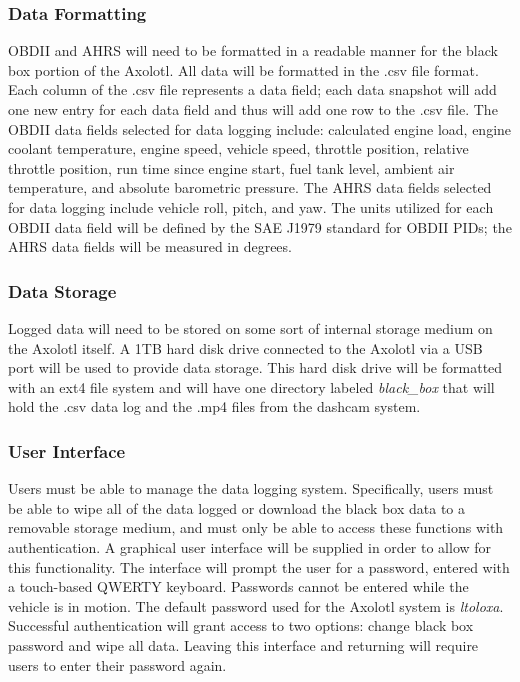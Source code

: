 \documentclass[onecolumn, draftclsnofoot,10pt, compsoc]{IEEEtran}
\begin{document}
\subsubsection{Data Formatting}
OBDII and AHRS will need to be formatted in a readable manner for the black box portion of the Axolotl. All data will be formatted in the .csv file format. Each column of the .csv file represents a data field; each data snapshot will add one new entry for each data field and thus will add one row to the .csv file. The OBDII data fields selected for data logging include: calculated engine load, engine coolant temperature, engine speed, vehicle speed, throttle position, relative throttle position, run time since engine start, fuel tank level, ambient air temperature, and absolute barometric pressure. The AHRS data fields selected for data logging include vehicle roll, pitch, and yaw. The units utilized for each OBDII data field will be defined by the SAE J1979 standard for OBDII PIDs; the AHRS data fields will be measured in degrees.

\subsubsection{Data Storage}
Logged data will need to be stored on some sort of internal storage medium on the Axolotl itself. A 1TB hard disk drive connected to the Axolotl via a USB port will be used to provide data storage. This hard disk drive will be formatted with an ext4 file system and will have one directory labeled \textit{black\_box} that will hold the .csv data log and the .mp4 files from the dashcam system.

\subsubsection{User Interface}
Users must be able to manage the data logging system. Specifically, users must be able to wipe all of the data logged or download the black box data to a removable storage medium, and must only be able to access these functions with authentication. A graphical user interface will be supplied in order to allow for this functionality. The interface will prompt the user for a password, entered with a touch-based QWERTY keyboard. Passwords cannot be entered while the vehicle is in motion. The default password used for the Axolotl system is \textit{ltoloxa}. Successful authentication will grant access to two options: change black box password and wipe all data. Leaving this interface and returning will require users to enter their password again.
\end{document}
